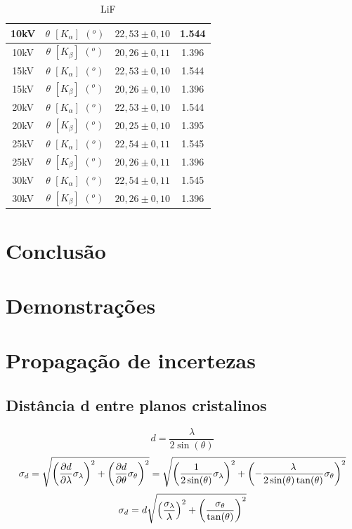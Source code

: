 \documentclass[article,12pt,openright,oneside,a4paper,brazil]{abntex2}
\begin{document}
\begin{table}[H]
    \centering
    \begin{tabular}{|c|c|c|c|}
        \hline
        10kV & $\theta$ $[K_\alpha]$ $(^o)$ & $22,53\pm0,10$ & 1.544\\ \hline
        10kV & $\theta$ $[K_\beta]$ $(^o)$ & $20,26\pm0,11$ & 1.396\\ \hline
        15kV & $\theta$ $[K_\alpha]$ $(^o)$ & $22,53\pm0,10$ & 1.544\\ \hline
        15kV & $\theta$ $[K_\beta]$ $(^o)$ & $20,26\pm0,10$ & 1.396\\ \hline
        20kV & $\theta$ $[K_\alpha]$ $(^o)$ & $22,53\pm0,10$ & 1.544\\ \hline
        20kV & $\theta$ $[K_\beta]$ $(^o)$ & $20,25\pm0,10$ & 1.395\\ \hline
        25kV & $\theta$ $[K_\alpha]$ $(^o)$ & $22,54\pm0,11$ & 1.545\\ \hline
        25kV & $\theta$ $[K_\beta]$ $(^o)$ & $20,26\pm0,11$ & 1.396\\ \hline
        30kV & $\theta$ $[K_\alpha]$ $(^o)$ & $22,54\pm0,11$ & 1.545\\ \hline
        30kV & $\theta$ $[K_\beta]$ $(^o)$ & $20,26\pm0,10$ & 1.396\\ \hline
    \end{tabular}
    \caption{LiF}
    \label{tab:my_label7}
\end{table}

\section{Conclusão}

\appendix

\newpage




\nocite{*}

\section{Demonstrações}

\section{Propagação de incertezas}

\subsection{Distância d entre planos cristalinos}
$$d=\frac{\lambda}{2\sin(\theta)}$$
$$\sigma_d=\sqrt{\qty(\pdv{d}{\lambda}\sigma_\lambda)^2+\qty(\pdv{d}{\theta}\sigma_\theta)^2}=\sqrt{\qty(\frac{1}{2\sin(\theta)}\sigma_\lambda)^2+\qty(-\frac{\lambda}{2\sin(\theta)\tan(\theta)}\sigma_\theta)^2}$$
$$\sigma_d=d\sqrt{\qty(\frac{\sigma_\lambda}{\lambda})^2+\qty(\frac{\sigma_\theta}{\tan(\theta)})^2}$$
\end{document}
